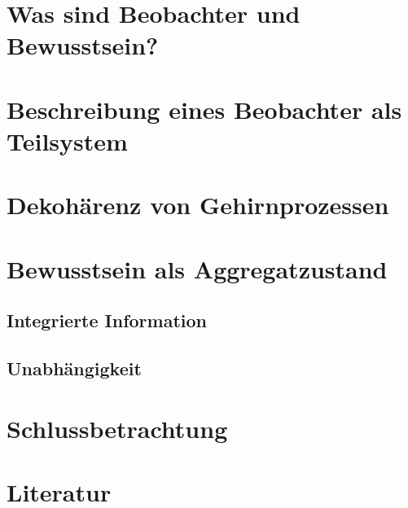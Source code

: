 
\pagestyle{empty}
\newcommand{\Quote}[1]{\enquote{\emph{#1}}}

	
	\section{Was sind Beobachter und Bewusstsein?}
	
	\section{Beschreibung eines Beobachter als Teilsystem}
	
	\section{Dekohärenz von Gehirnprozessen}
	
	\section{Bewusstsein als Aggregatzustand}
	
		\subsection{Integrierte Information}
		
		\subsection{Unabhängigkeit}
		
	\section{Schlussbetrachtung}
	
	
	\section{Literatur}
	\printbibliography
